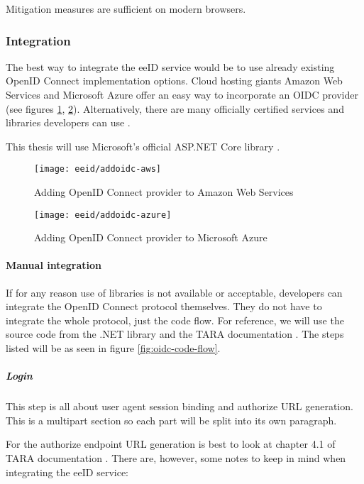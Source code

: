 Mitigation measures are sufficient on modern browsers.

\subsubsection{Integration}

The best way to integrate the eeID service would be to use already existing OpenID Connect implementation options. Cloud hosting giants Amazon Web Services and Microsoft Azure offer an easy way to incorporate an OIDC provider (see figures \ref{fig:addoidc-aws}, \ref{fig:addoidc-azure}). Alternatively, there are many officially certified services and libraries developers can use \cite{oidc-certified}.

This thesis will use Microsoft's official ASP.NET Core library \cite{ms-auth-oidc-src}.

\begin{figure}
  \centering
  \texttt{[image: eeid/addoidc-aws]}
  \caption{Adding OpenID Connect provider to Amazon Web Services}
  \label{fig:addoidc-aws}
\end{figure}

\begin{figure}
  \centering
  \texttt{[image: eeid/addoidc-azure]}
  \caption{Adding OpenID Connect provider to Microsoft Azure}
  \label{fig:addoidc-azure}
\end{figure}

\paragraph{Manual integration} If for any reason use of libraries is not available or acceptable, developers can integrate the OpenID Connect protocol themselves. They do not have to integrate the whole protocol, just the code flow. For reference, we will use the source code from the {.NET} library \cite{ms-auth-oidc-src} and the TARA documentation \cite{tara-technical}. The steps listed will be as seen in figure \ref{fig:oidc-code-flow}.

\subparagraph{Login}

This step is all about user agent session binding and {authorize URL} generation. This is a multipart section so each part will be split into its own paragraph.

For the {authorize} endpoint URL generation is best to look at chapter 4.1 of TARA documentation \cite{tara-technical}. There are, however, some notes to keep in mind when integrating the eeID service:

